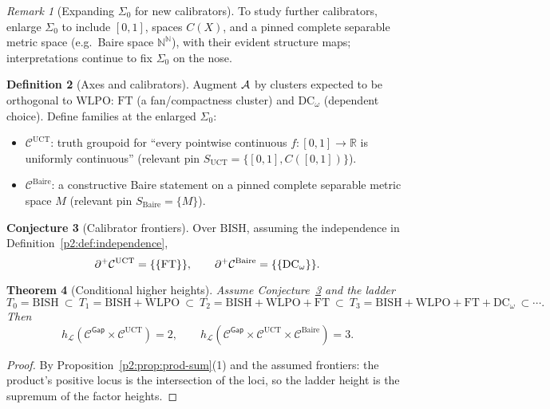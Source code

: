 \documentclass[11pt]{article}
\newtheorem{theorem}{Theorem}[section]
\theoremstyle{definition}
\newtheorem{definition}[theorem]{Definition}
\newtheorem{conjecture}[theorem]{Conjecture}
\theoremstyle{remark}
\newtheorem{remark}[theorem]{Remark}
\newcommand{\N}{\mathbb{N}}
\newcommand{\R}{\mathbb{R}}
\newcommand{\WLPO}{\mathrm{WLPO}}
\newcommand{\BISH}{\mathrm{BISH}}
\newcommand{\SigmaZero}{\Sigma_{0}}
\begin{document}
\begin{remark}[Expanding \(\SigmaZero\) for new calibrators]\label{p2:rem:expand-sigma0}
To study further calibrators, enlarge \(\SigmaZero\) to include \([0,1]\),
spaces \(C(X)\), and a pinned complete separable metric space (e.g.\ Baire space \(\N^\N\)),
with their evident structure maps; interpretations continue to fix \(\SigmaZero\) on the nose.
\end{remark}

\begin{definition}[Axes and calibrators]\label{p2:def:axes-calibrators}
Augment \(\mathcal{A}\) by clusters expected to be orthogonal to \(\WLPO\):
\(\mathrm{FT}\) (a fan/compactness cluster) and \(\mathrm{DC}_\omega\) (dependent choice).
Define families at the enlarged \(\SigmaZero\):
\begin{itemize}
\item \(\mathcal C^{\mathrm{UCT}}\): truth groupoid for ``every pointwise continuous \(f:[0,1]\to\R\) is uniformly continuous'' (relevant pin \(S_{\mathrm{UCT}}=\{[0,1],C([0,1])\}\)).
\item \(\mathcal C^{\mathrm{Baire}}\): a constructive Baire statement on a pinned complete separable metric space \(M\) (relevant pin \(S_{\mathrm{Baire}}=\{M\}\)).
\end{itemize}
\end{definition}

\begin{conjecture}[Calibrator frontiers]\label{p2:conj:calibrators}
Over \(\BISH\), assuming the independence in Definition~\ref{p2:def:independence},
\[
\partial^{+}\mathcal C^{\mathrm{UCT}}=\{\{\mathrm{FT}\}\},\qquad
\partial^{+}\mathcal C^{\mathrm{Baire}}=\{\{\mathrm{DC}_\omega\}\}.
\]
\end{conjecture}

\begin{theorem}[Conditional higher heights]\label{p2:thm:conditional-heights}
Assume Conjecture~\ref{p2:conj:calibrators} and the ladder
\[
T_0=\BISH\ \subset\ T_1=\BISH+\WLPO\ \subset\ T_2=\BISH+\WLPO+\mathrm{FT}\ \subset\
T_3=\BISH+\WLPO+\mathrm{FT}+\mathrm{DC}_\omega\ \subset\cdots.
\]
Then
\[
h_{\mathcal L}\!\left(\mathcal C^{\mathsf{Gap}}\times\mathcal C^{\mathrm{UCT}}\right)=2,\qquad
h_{\mathcal L}\!\left(\mathcal C^{\mathsf{Gap}}\times\mathcal C^{\mathrm{UCT}}\times\mathcal C^{\mathrm{Baire}}\right)=3.
\]
\end{theorem}

\begin{proof}
By Proposition~\ref{p2:prop:prod-sum}(1) and the assumed frontiers: the product’s positive locus is the intersection of the loci, so the ladder height is the supremum of the factor heights.
\end{proof}
\end{document}
